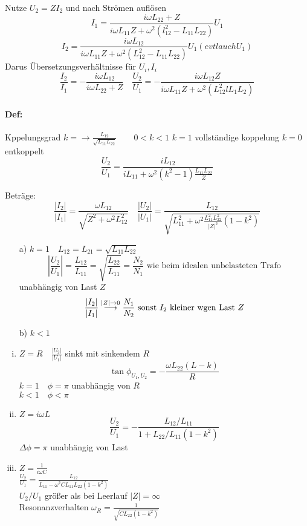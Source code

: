 \documentclass[titlepage,12pt,a4paper,ngerman]{report}
\newcommand{\tx}[1]{\textrm{#1}}
\begin{document}
Nutze $ U_2 = Z I_2 $ und nach Strömen auflösen
$$ I_1 = \frac{i \omega L_{22} + Z}{i \omega L_{11} Z + \omega^2 (l_{12}^2 - L_{11} L_{22})} U_1 $$
$$ I_2 = \frac{i \omega L_{12}}{i \omega L_{11} Z + \omega^2 (L_{12}^2 - L_{11} L_{22})} U_1 (evtl auch U_1) $$
Darus Übersetzungsverhältnisse für $ U_i, I_i $
$$ \frac{I_2}{I_1} = - \frac{i \omega L_{12}}{i \omega L_{22} + Z} \quad \frac{U_2}{U_1} = - \frac{i \omega L_{12} Z}{i \omega L_{11} Z + \omega^2 (L_{12}^2 l L_1 L_2)}$$

\paragraph{Def:} Kppelungsgrad $k= \rightarrow \frac{L_{12}}{\sqrt{L_{11}L_{22}}} \qquad 0<k<1$
$k=1$ vollständige koppelung $k = 0$ entkoppelt
$$\frac{U_2}{U_1} = \frac{i L_{12}}{i L_{11}+\omega^2 (k^2 - 1) \frac{L_{11}L_{22}}{Z}}$$

Beträge: $$ \frac{|I_2|}{|I_1|} = \frac{\omega L_{12}}{\sqrt{Z^2+\omega^2 L_{12}^2}} \quad \frac{|U_2|}{|U_1|} = \frac{L_{12}}{\sqrt{ L_{11}^2 + \omega^2 \frac{L_{11}^2 L_{22}^2}{|Z|^2} (1-k^2)}}$$

\begin{enumerate}
 	\item[a)] $k = 1 \quad L_{12} = L_{21} = \sqrt{L_{11}L_{22}}$
 	$$|\frac{U_2}{U_1}| = \frac{L_{12}}{L_{11}} = \sqrt{\frac{L_{22}}{L_{11}}} = \frac{N_2}{N_1} \tx{ wie beim idealen unbelasteten Trafo}$$
 	unabhängig von Last $Z$
 	$$\frac{|I_2|}{|I_1|}  \buildrel{|Z| \rightarrow 0} \over \longrightarrow \frac{N_1}{N_2} \tx{ sonst $I_2$ kleiner wgen Last }Z$$
 	\item[b)] $ k<1 $
 \end{enumerate}
\begin{enumerate}[i)]
	\item $ Z=R\quad \frac{|U_2|}{|U_1|} $ sinkt mit sinkendem $R$
	$$\tan \phi_{U_1,U_2} = -\frac{\omega L_{22}(L-k)}{R}$$
	$k=1 \quad \phi = \pi$ unabhängig von $R$\\
	$k<1 \quad \phi <\pi$ 
	\item   $Z = i \omega L$
	$$\frac{U_2}{U_1} = - \frac{L_{12}/L_{11}}{1+ L_{22}/L_{11} (1-k^2)}$$
	$\Delta \phi = \pi$ unabhängig von Last

	\item $ Z = \frac{1}{i \omega C} $\\
	$ \frac{U_2}{U_1} = \frac{L_{12}}{L_{11} - \omega^2 C L_{11} L_{22} (1-k^2)} $\\
	$ U_2/U_1 $ größer als bei Leerlauf $ |Z| = \infty $\\
	Resonanzverhalten $ \omega_R = \frac{1}{\sqrt{C L_{22} (1-k^2)}} $
\end{enumerate}
\end{document}
